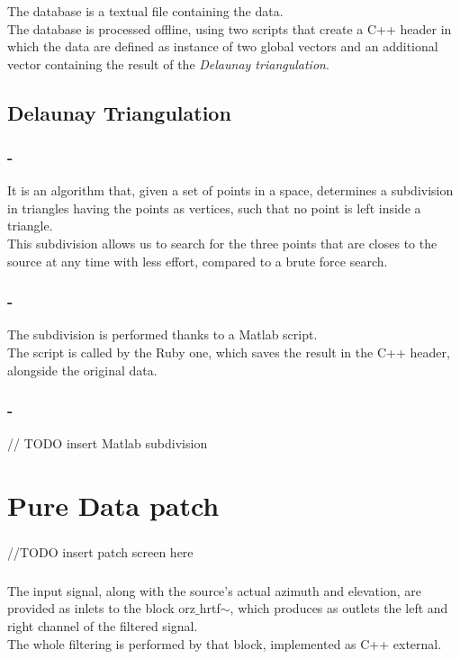 \documentclass{beamer}
\begin{document}
	\begin{frame}
		\frametitle{\insertsection}
		The database is a textual file containing the data.\\
		The database is processed offline, using two scripts that create a C++ header in which the data
		are defined as instance of two global vectors and an additional vector containing the result
		of the {\em Delaunay triangulation}.\\
	\end{frame}

	\subsection{Delaunay Triangulation}

	\begin{frame}
		\frametitle{\insertsection - \insertsubsection}
		It is an algorithm that, given a set of points in a space, determines a subdivision in triangles
		having the points as vertices, such that no point is left inside a triangle.\\
		This subdivision allows us to search for the three points that are closes to the source at any time
		with less effort, compared to a brute force search.\\
	\end{frame}

	\begin{frame}
		\frametitle{\insertsection - \insertsubsection}
		The subdivision is performed thanks to a Matlab script.\\
		The script is called by the Ruby one, which saves the result in the C++ header, alongside
		the original data.
	\end{frame}

	\begin{frame}
		\frametitle{\insertsection - \insertsubsection}
		// TODO insert Matlab subdivision
	\end{frame}

	\section{Pure Data patch}

	\begin{frame}
		\frametitle{\insertsection}
		//TODO insert patch screen here
	\end{frame}

	\begin{frame}
		\frametitle{\insertsection}
		The input signal, along with the source's actual azimuth and elevation, are provided
		as inlets to the block orz$\_$hrtf$\sim$, which produces as outlets the
		left and right channel of the filtered signal.\\
		The whole filtering is performed by that block, implemented as C++ external.\\
	\end{frame}
\end{document}
